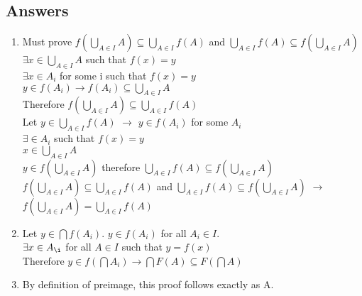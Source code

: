 \documentclass{article}
\begin{document}
\subsection*{Answers}
\begin{enumerate}[label=\alph*]
\item Must prove \(f(\bigcup\limits_{A \in I}A) \subseteq \bigcup\limits_{A \in I}f(A)\) and \(\bigcup\limits_{A \in I}f(A) \subseteq f(\bigcup\limits_{A \in I}A)\) \\ \(\exists x \in \bigcup\limits_{A \in I}A\) such that \(f(x) = y\) \\ \(\exists x \in A_i\) for some i such that \(f(x) = y\) \\ \(y \in f(A_i) \rightarrow f(A_i) \subseteq \bigcup\limits_{A \in I}A \) \\ Therefore \(f(\bigcup\limits_{A \in I}A) \subseteq \bigcup\limits_{A \in I}f(A)\)  \\ Let \(y \in \bigcup\limits_{A \in I}f(A)\) \(\rightarrow\) \(y \in f(A_i)\) for some \(A_i\) \\ \(\exists \in A_i\) such that \(f(x) = y \) \\ \(x \in \bigcup\limits_{A \in I}A\) \\ \(y \in f(\bigcup\limits_{A \in I}A)\) therefore \(\bigcup\limits_{A \in I}f(A) \subseteq f(\bigcup\limits_{A \in I}A)\) \\ \(f(\bigcup\limits_{A \in I}A) \subseteq \bigcup\limits_{A \in I}f(A)\) and \(\bigcup\limits_{A \in I}f(A) \subseteq f(\bigcup\limits_{A \in I}A)\) \(\rightarrow\) \(f(\bigcup\limits_{A \in I}A) = \bigcup\limits_{A \in I}f(A)\)
\item Let \(y \in \bigcap f(A_{i})\). \(y \in f(A_{i})\) for all \(A_{i} \in I\).\\ \(\exists x \in A_{\i}\) for all \(A \in I \) such that \(y = f(x)\) 
\\Therefore \(y \in f(\bigcap A_{i}) \rightarrow \bigcap F(A) \subseteq F(\bigcap A)\) 
\item By definition of preimage, this proof follows exactly as A. \\

\end{enumerate}
\end{document}
